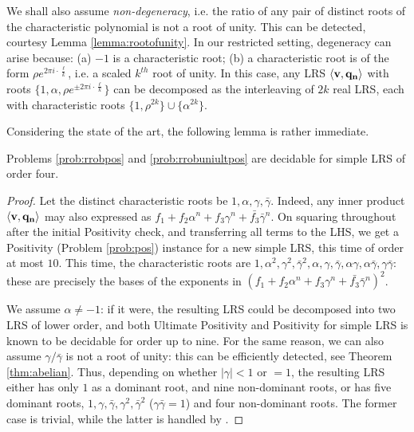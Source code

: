 We shall also assume \textit{non-degeneracy}, i.e. the ratio of any pair of distinct roots of the characteristic polynomial is not a root of unity. This can be detected, courtesy Lemma \ref{lemma:rootofunity}. In our restricted setting, degeneracy can arise because: (a) $-1$ is a characteristic root; (b) a characteristic root is of the form $\rho e^{2\pi i \cdot \frac{\ell}{k}}$, i.e. a scaled $k^{th}$ root of unity. In this case, any LRS $\langle\mathbf{v}, \mathbf{q_n}\rangle$ with roots $\{1, \alpha, \rho e^{\pm 2\pi i \cdot \frac{\ell}{k}}\}$ can be decomposed as the interleaving of $2k$ real LRS, each with characteristic roots $\{1, \rho^{2k}\} \cup \{\alpha^{2k}\}$.

Considering the state of the art, the following lemma is rather immediate. 
\begin{lemma}
Problems \ref{prob:rrobpos} and \ref{prob:rrobuniultpos} are decidable for simple LRS of order four.
\end{lemma}
\begin{proof}
Let the distinct characteristic roots be $1, \alpha, \gamma, \bar{\gamma}$. Indeed, any inner product $\langle\mathbf{v}, \mathbf{q_n}\rangle$ may also expressed as $f_1 + f_2\alpha^n + f_3 \gamma^n + \bar{f_3}\bar{\gamma}^n$. On squaring throughout after the initial Positivity check, and transferring all terms to the LHS, we get a Positivity (Problem \ref{prob:pos}) instance for a new simple LRS, this time of order at most $10$. This time, the characteristic roots are $1, \alpha^2, \gamma^2, \bar{\gamma}^2, \alpha, \gamma, \bar{\gamma}, \alpha\gamma, \alpha\bar{\gamma}, \gamma\bar{\gamma}$: these are precisely the bases of the exponents in $(f_1 + f_2\alpha^n + f_3 \gamma^n + \bar{f_3}\bar{\gamma}^n)^2$.

We assume $\alpha \ne -1$: if it were, the resulting LRS could be decomposed into two LRS of lower order, and both Ultimate Positivity \cite{ouaknine2014ultimate} and Positivity  \cite{ouaknine2014positivity} for simple LRS is known to be decidable for order up to nine. For the same reason, we can also assume $\gamma/\bar{\gamma}$ is not a root of unity: this can be efficiently detected, see Theorem \ref{thm:abelian}. Thus, depending on whether $|\gamma| < 1$ or $= 1$, the resulting LRS either has only $1$ as a dominant root, and nine non-dominant roots, or has five dominant roots, $1, \gamma, \bar{\gamma}, \gamma^2, \bar{\gamma}^2$ ($\gamma\bar{\gamma} = 1$) and four non-dominant roots. The former case is trivial, while the latter is handled by \cite{ouaknine2014positivity}.
\end{proof}

